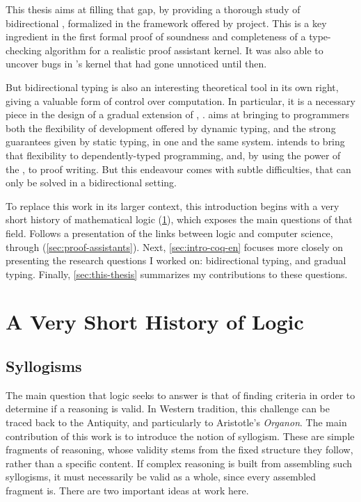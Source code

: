 This thesis aims at filling that gap, by providing a thorough study of bidirectional ,
formalized in the framework offered by  project. This is a key
ingredient in the first formal proof of soundness and completeness of a type-checking
algorithm for a realistic proof assistant kernel.
It was also able to uncover bugs in ’s kernel that had gone unnoticed until then.

But bidirectional typing is also an interesting theoretical tool in its own right,
giving a valuable form of control over computation.
In particular, it is a necessary piece in the design of a gradual extension of
, .
 aims at bringing to programmers both the flexibility of
development offered by dynamic typing, and the strong guarantees given
by static typing, in one and the same system.  intends
to bring that flexibility to dependently-typed programming,
and, by using the power of the , to proof writing.
But this endeavour comes with subtle difficulties,
that can only be solved in a bidirectional setting.

To replace this work in its larger context, this introduction begins with a very
short history of mathematical logic (\cref{sec:logic-history}), which exposes the
main questions of that field. Follows a presentation of the links between logic and
computer science, through  (\cref{sec:proof-assistants}).
Next, \cref{sec:intro-coq-en} focuses more closely on presenting
the research questions I worked on: bidirectional typing,  and gradual typing.
Finally, \cref{sec:this-thesis} summarizes my contributions to these questions.

\section{A Very Short History of Logic}
\label{sec:logic-history}

\subsection{Syllogisms}

The main question that logic seeks to answer is that of finding criteria in order to determine
if a reasoning is valid. In Western tradition, this challenge can be traced back to the
Antiquity, and particularly to Aristotle's \textit{Organon}.
The main contribution of this work is to introduce the notion of syllogism.
These are simple fragments of reasoning, whose validity stems from the
fixed structure they follow, rather than a specific content.%
If complex reasoning is built from assembling such syllogisms, it must necessarily be valid as
a whole, since every assembled fragment is. There are two important ideas at work here.

